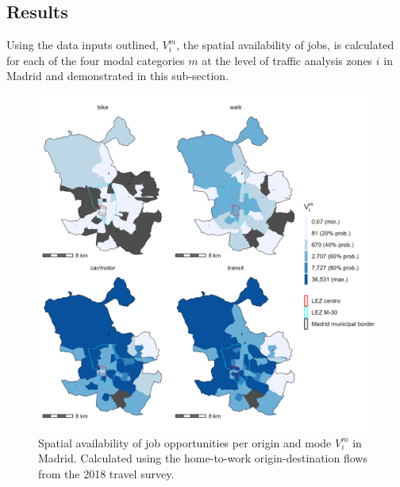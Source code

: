 \documentclass[]{trbunofficial}
\begin{document}
\hypertarget{results}{%
\subsection{Results}\label{results}}

Using the data inputs outlined, \(V_i^m\), the spatial availability of
jobs, is calculated for each of the four modal categories \(m\) at the
level of traffic analysis zones \(i\) in Madrid and demonstrated in this
sub-section.

\begin{figure}

{\centering \includegraphics[width=1\linewidth]{images/SA_im_V_zn208_plot} 

}

\caption{\label{fig:Fig5} Spatial availability of job opportunities per origin and mode $V_i^m$ in Madrid. Calculated using the home-to-work origin-destination flows from the 2018 travel survey. }\label{fig:SA-m-plot}
\end{figure}
\end{document}
